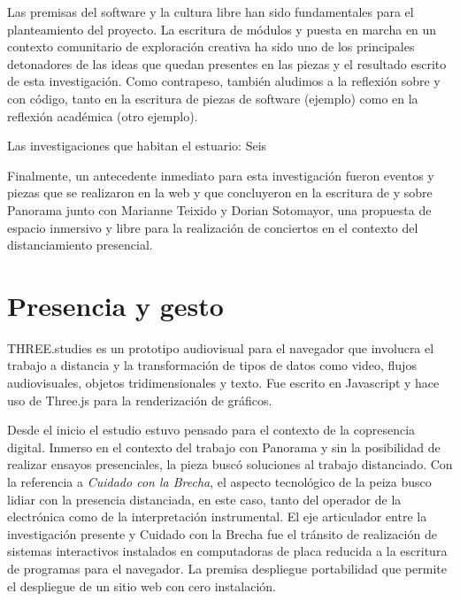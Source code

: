 \documentclass[11pt,letterpaper, twocolumn, twoside, openright,
headinclude,footinclude,BCOR5mm,
numbers=noenddot,cleardoublepage=empty,
tablecaptionabove]{article}
\begin{document}
Las premisas del software y la cultura libre han sido fundamentales para el planteamiento del proyecto. La escritura de módulos y puesta en marcha en un contexto comunitario de exploración creativa ha sido uno de los principales detonadores de las ideas que quedan presentes en las piezas y el resultado escrito de esta investigación. Como contrapeso, también aludimos a la reflexión sobre y con código, tanto en la escritura de piezas de software (ejemplo) como en la reflexión académica (otro ejemplo). %

Las investigaciones que habitan el estuario: Seis

Finalmente, un antecedente inmediato para esta investigación fueron eventos y piezas que se realizaron en la web y que concluyeron en la escritura de y sobre Panorama junto con Marianne Teixido y Dorian Sotomayor, una propuesta de espacio inmersivo y libre para la realización de conciertos en el contexto del distanciamiento presencial. 


\section*{Presencia y gesto}

THREE.studies es un prototipo audiovisual para el navegador que involucra el trabajo a distancia y la transformación de tipos de datos como video, flujos audiovisuales, objetos tridimensionales y texto. Fue escrito en Javascript y hace uso de Three.js para la renderización de gráficos. 

Desde el inicio el estudio estuvo pensado para el contexto de la copresencia digital. Inmerso en el contexto del trabajo con Panorama y sin la posibilidad de realizar ensayos presenciales, la pieza buscó soluciones al trabajo distanciado. Con la referencia a \emph{Cuidado con la Brecha}, el aspecto tecnológico de la peiza busco lidiar con la presencia distanciada, en este caso, tanto del operador de la electrónica como de la interpretación instrumental. El eje articulador entre la investigación presente y Cuidado con la Brecha fue el tránsito de realización de sistemas interactivos instalados en computadoras de placa reducida a la escritura de programas para el navegador. La premisa despliegue portabilidad que permite el despliegue de un sitio web con cero instalación. %
\end{document}
